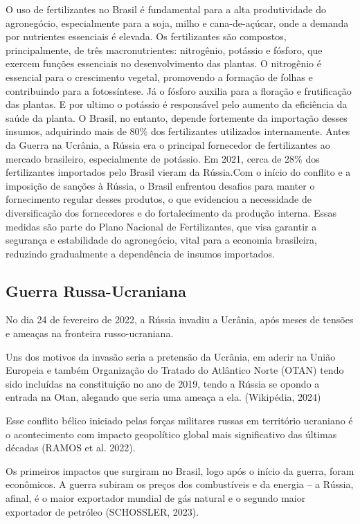 \documentclass[article,12pt,oneside,a4paper,english,brazil,sumario=tradicional]{abntex2}
\begin{document}
O uso de fertilizantes no Brasil é fundamental para a alta produtividade do agronegócio, especialmente para a soja, milho e cana-de-açúcar, onde a demanda por nutrientes essenciais é elevada. Os fertilizantes são compostos, principalmente, de três macronutrientes: nitrogênio, potássio e fósforo, que exercem funções essenciais no desenvolvimento das plantas. O nitrogênio é essencial para o crescimento vegetal, promovendo a formação de folhas e contribuindo para a fotossíntese. Já o fósforo auxilia para a floração e frutificação das plantas. E por ultimo o potássio é responsável pelo aumento da eficiência da saúde da planta. O Brasil, no entanto, depende fortemente da importação desses insumos, adquirindo mais de 80\% dos fertilizantes utilizados internamente. Antes da Guerra na Ucrânia, a Rússia era o principal fornecedor de fertilizantes ao mercado brasileiro, especialmente de potássio. Em 2021, cerca de 28\% dos fertilizantes importados pelo Brasil vieram da Rússia.Com o início do conflito e a imposição de sanções à Rússia, o Brasil enfrentou desafios para manter o fornecimento regular desses produtos, o que evidenciou a necessidade de diversificação dos fornecedores e do fortalecimento da produção interna. Essas medidas são parte do Plano Nacional de Fertilizantes, que visa garantir a segurança e estabilidade do agronegócio, vital para a economia brasileira, reduzindo gradualmente a dependência de insumos importados. 

\subsection{Guerra Russa-Ucraniana}

No dia 24 de fevereiro de 2022, a Rússia invadiu a Ucrânia, após meses de tensões e ameaças na fronteira russo-ucraniana.

Uns dos motivos da invasão seria a pretensão da Ucrânia, em aderir na União Europeia e também Organização do Tratado do Atlântico Norte (OTAN) tendo sido incluídas na constituição no ano de 2019, tendo a Rússia se opondo a entrada na Otan, alegando que seria uma ameaça a ela. (Wikipédia, 2024)

Esse conflito bélico iniciado pelas forças militares russas em território ucraniano é o acontecimento com impacto geopolítico global mais significativo das últimas décadas (RAMOS et al. 2022).

Os primeiros impactos que surgiram no Brasil, logo após o início da guerra, foram econômicos. A guerra subiram os preços dos combustíveis e da energia – a Rússia, afinal, é o maior exportador mundial de gás natural e o segundo maior exportador de petróleo (SCHOSSLER, 2023).
\end{document}
